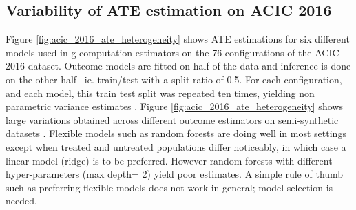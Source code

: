 \documentclass[unnumsec,webpdf,contemporary,large]{oup-authoring-template}%
\theoremstyle{thmstyleone}%
\theoremstyle{thmstyletwo}%
\theoremstyle{thmstylethree}%
\begin{document}
\clearpage


\onecolumn

\renewcommand\thefigure{S\arabic{figure}}
\renewcommand\thetable{S\arabic{table}}
\setcounter{figure}{0}
\setcounter{table}{0}


\begin{appendices}


    \setcounter{secnumdepth}{3}



    \section{Variability of ATE estimation on ACIC
      2016}\label{apd:toy_example:acic_2016_ate_variability}

    Figure \ref{fig:acic_2016_ate_heterogeneity} shows ATE estimations for six
    different models used in g-computation estimators on the 76 configurations of
    the ACIC 2016 dataset. Outcome models are fitted on half of the data and
    inference is done on the other half --ie. train/test with a split ratio of 0.5.
    For each configuration, and each model, this train test split was repeated ten
    times, yielding non parametric variance estimates
    \cite{bouthillier_accounting_2021}. Figure \ref{fig:acic_2016_ate_heterogeneity}
    shows large variations obtained across different outcome estimators on
    semi-synthetic datasets \cite{dorie_automated_2019}. Flexible models such as
    random forests are doing well in most settings except when treated and untreated
    populations differ noticeably, in which case a linear model (ridge) is to be
    preferred. However random forests with different hyper-parameters (max depth= 2)
    yield poor estimates. A simple rule of thumb such as preferring flexible models
    does not work in general; model selection is needed.


\end{appendices}
\end{document}

